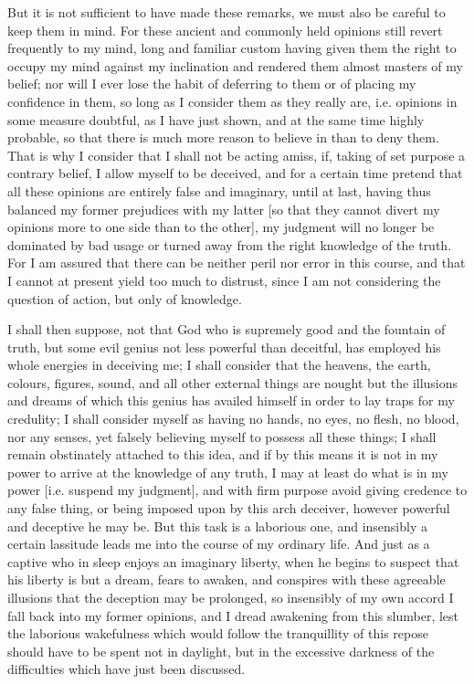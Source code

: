 But it is not sufficient to have made these remarks, we must also be
careful to keep them in mind. For these ancient and commonly held
opinions still revert frequently to my mind, long and familiar custom
having given them the right to occupy my mind against my inclination
and rendered them almost masters of my belief; nor will I ever lose
the habit of deferring to them or of placing my confidence in them, so
long as I consider them as they really are, i.e. opinions in some
measure doubtful, as I have just shown, and at the same time highly
probable, so that there is much more reason to believe in than to deny
them. That is why I consider that I shall not be acting amiss, if,
taking of set purpose a contrary belief, I allow myself to be
deceived, and for a certain time pretend that all these opinions are
entirely false and imaginary, until at last, having thus balanced my
former prejudices with my latter [so that they cannot divert my
opinions more to one side than to the other], my judgment will no
longer be dominated by bad usage or turned away from the right
knowledge of the truth. For I am assured that there can be neither
peril nor error in this course, and that I cannot at present yield too
much to distrust, since I am not considering the question of action,
but only of knowledge.

I shall then suppose, not that God who is supremely good and the
fountain of truth, but some evil genius not less powerful than
deceitful, has employed his whole energies in deceiving me; I shall
consider that the heavens, the earth, colours, figures, sound, and all
other external things are nought but the illusions and dreams of which
this genius has availed himself in order to lay traps for my
credulity; I shall consider myself as having no hands, no eyes, no
flesh, no blood, nor any senses, yet falsely believing myself to
possess all these things; I shall remain obstinately attached to this
idea, and if by this means it is not in my power to arrive at the
knowledge of any truth, I may at least do what is in my power [i.e.
suspend my judgment], and with firm purpose avoid giving credence to
any false thing, or being imposed upon by this arch deceiver, however
powerful and deceptive he may be. But this  task is a
laborious one, and insensibly a certain lassitude leads me into the
course of my ordinary life. And just as a captive who in sleep enjoys
an imaginary liberty, when he begins to suspect that his liberty is
but a dream, fears to awaken, and conspires with these agreeable
illusions that the deception may be prolonged, so insensibly of my own
accord I fall back into my former opinions, and I dread awakening
from this slumber, lest the laborious wakefulness which would follow
the tranquillity of this repose should have to be spent not in
daylight, but in the excessive darkness of the difficulties which have
just been discussed.

